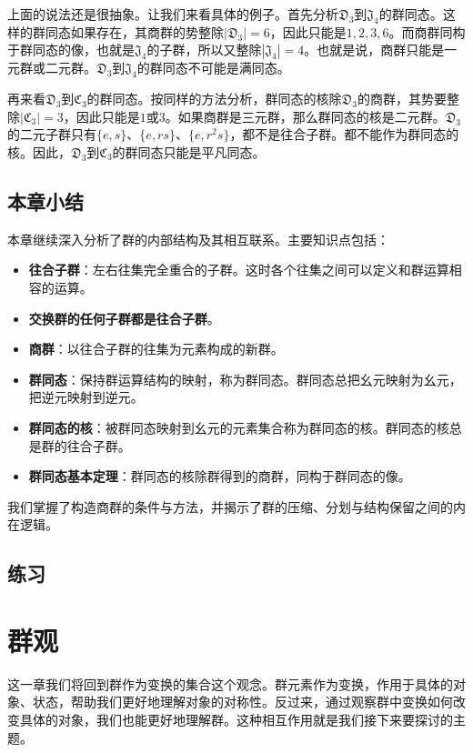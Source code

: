 \documentclass[12pt,UTF8,fontset=none]{ctexbook}
\begin{document}
上面的说法还是很抽象。让我们来看具体的例子。首先分析$\mathfrak{D}_3$到$\mathfrak{J}_4$的群同态。这样的群同态如果存在，其商群的势整除$|\mathfrak{D}_3|=6$，因此只能是$1,2,3,6$。而商群同构于群同态的像，也就是$\mathfrak{J}_4$的子群，所以又整除$|\mathfrak{J}_4|=4$。也就是说，商群只能是一元群或二元群。$\mathfrak{D}_3$到$\mathfrak{J}_4$的群同态不可能是满同态。

再来看$\mathfrak{D}_3$到$\mathfrak{C}_3$的群同态。按同样的方法分析，群同态的核除$\mathfrak{D}_3$的商群，其势要整除$|\mathfrak{C}_3|=3$，因此只能是$1$或$3$。如果商群是三元群，那么群同态的核是二元群。$\mathfrak{D}_3$的二元子群只有$\{e,s\}$、$\{e,rs\}$、$\{e,r^2s\}$，都不是往合子群。都不能作为群同态的核。因此，$\mathfrak{D}_3$到$\mathfrak{C}_3$的群同态只能是平凡同态。

\clearpage
\section*{本章小结}

本章继续深入分析了群的内部结构及其相互联系。主要知识点包括：
\begin{itemize}
    \item \textbf{往合子群}：左右往集完全重合的子群。这时各个往集之间可以定义和群运算相容的运算。
    \item \textbf{交换群的任何子群都是往合子群}。
    \item \textbf{商群}：以往合子群的往集为元素构成的新群。
    \item \textbf{群同态}：保持群运算结构的映射，称为群同态。群同态总把幺元映射为幺元，把逆元映射到逆元。
    \item \textbf{群同态的核}：被群同态映射到幺元的元素集合称为群同态的核。群同态的核总是群的往合子群。
    \item \textbf{群同态基本定理}：群同态的核除群得到的商群，同构于群同态的像。
\end{itemize}
我们掌握了构造商群的条件与方法，并揭示了群的压缩、分划与结构保留之间的内在逻辑。

\clearpage
\section{练习}

\chapter{群观}

这一章我们将回到群作为变换的集合这个观念。群元素作为变换，作用于具体的对象、状态，帮助我们更好地理解对象的对称性。反过来，通过观察群中变换如何改变具体的对象，我们也能更好地理解群。这种相互作用就是我们接下来要探讨的主题。
\end{document}
